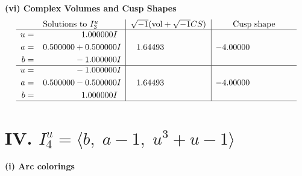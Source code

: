 \documentclass[1p]{elsarticle_modified}
\theoremstyle{definition}
\newcommand{\I}{\sqrt{-1}}
\begin{document}
\newpage\flushleft \textbf{(vi) Complex Volumes and Cusp Shapes}
$$\begin{array}{c|c|c}  
\text{Solutions to }I^u_{3}& \I (\text{vol} + \sqrt{-1}CS) & \text{Cusp shape}\\
 \hline 
\begin{aligned}
u &= \phantom{-0.000000 -}1.000000 I \\
a &= \phantom{-}0.500000 + 0.500000 I \\
b &= \phantom{-0.000000 } -1.000000 I\end{aligned}
 & \phantom{-}1.64493\phantom{ +0.000000I} & -4.00000\phantom{ +0.000000I} \\ \hline\begin{aligned}
u &= \phantom{-0.000000 } -1.000000 I \\
a &= \phantom{-}0.500000 - 0.500000 I \\
b &= \phantom{-0.000000 -}1.000000 I\end{aligned}
 & \phantom{-}1.64493\phantom{ +0.000000I} & -4.00000\phantom{ +0.000000I}\\
 \hline 
 \end{array}$$\newpage\newpage\renewcommand{\arraystretch}{1}
\centering \section*{IV. $I^u_{4}= \langle b,\;a-1,\;u^3+u-1 \rangle$}
\flushleft \textbf{(i) Arc colorings}\\
\end{document}
